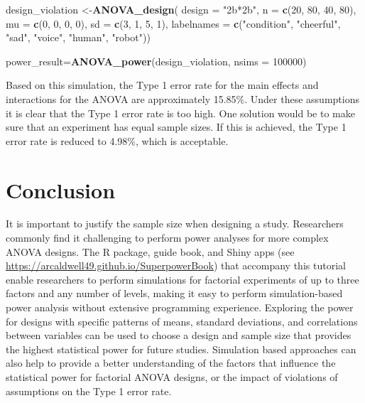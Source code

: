 \documentclass[
  english,
  ,jou,floatsintext]{apa6}
\newenvironment{Shaded}{\begin{snugshade}}{\end{snugshade}}
\newcommand{\DataTypeTok}[1]{\textcolor[rgb]{0.13,0.29,0.53}{#1}}
\newcommand{\DecValTok}[1]{\textcolor[rgb]{0.00,0.00,0.81}{#1}}
\newcommand{\KeywordTok}[1]{\textcolor[rgb]{0.13,0.29,0.53}{\textbf{#1}}}
\newcommand{\NormalTok}[1]{#1}
\newcommand{\StringTok}[1]{\textcolor[rgb]{0.31,0.60,0.02}{#1}}
\begin{document}
\begin{Shaded}
\begin{Highlighting}[]
\NormalTok{design_violation <-}\KeywordTok{ANOVA_design}\NormalTok{(}
 \DataTypeTok{design =} \StringTok{"2b*2b"}\NormalTok{, }\DataTypeTok{n =} \KeywordTok{c}\NormalTok{(}\DecValTok{20}\NormalTok{, }\DecValTok{80}\NormalTok{, }\DecValTok{40}\NormalTok{, }\DecValTok{80}\NormalTok{), }
 \DataTypeTok{mu =} \KeywordTok{c}\NormalTok{(}\DecValTok{0}\NormalTok{, }\DecValTok{0}\NormalTok{, }\DecValTok{0}\NormalTok{, }\DecValTok{0}\NormalTok{), }\DataTypeTok{sd =} \KeywordTok{c}\NormalTok{(}\DecValTok{3}\NormalTok{, }\DecValTok{1}\NormalTok{, }\DecValTok{5}\NormalTok{, }\DecValTok{1}\NormalTok{),}
 \DataTypeTok{labelnames =} \KeywordTok{c}\NormalTok{(}\StringTok{"condition"}\NormalTok{, }
                \StringTok{"cheerful"}\NormalTok{, }\StringTok{"sad"}\NormalTok{,}
                \StringTok{"voice"}\NormalTok{, }
                \StringTok{"human"}\NormalTok{, }\StringTok{"robot"}\NormalTok{))}

\NormalTok{power_result=}\KeywordTok{ANOVA_power}\NormalTok{(design_violation,}
                         \DataTypeTok{nsims =} \DecValTok{100000}\NormalTok{)}
\end{Highlighting}
\end{Shaded}

Based on this simulation, the Type 1 error rate for the main effects and interactions for the ANOVA are approximately 15.85\%.
Under these assumptions it is clear that the Type 1 error rate is too high.
One solution would be to make sure that an experiment has equal sample sizes.
If this is achieved, the Type 1 error rate is reduced to 4.98\%, which is acceptable.

\hypertarget{conclusion}{%
\section{Conclusion}\label{conclusion}}

It is important to justify the sample size when designing a study.
Researchers commonly find it challenging to perform power analyses for more complex ANOVA designs.
The R package, guide book, and Shiny apps (see \url{https://arcaldwell49.github.io/SuperpowerBook}) that accompany this tutorial enable researchers to perform simulations for factorial experiments of up to three factors and any number of levels, making it easy to perform simulation-based power analysis without extensive programming experience.
Exploring the power for designs with specific patterns of means, standard deviations, and correlations between variables can be used to choose a design and sample size that provides the highest statistical power for future studies.
Simulation based approaches can also help to provide a better understanding of the factors that influence the statistical power for factorial ANOVA designs, or the impact of violations of assumptions on the Type 1 error rate.
\end{document}
